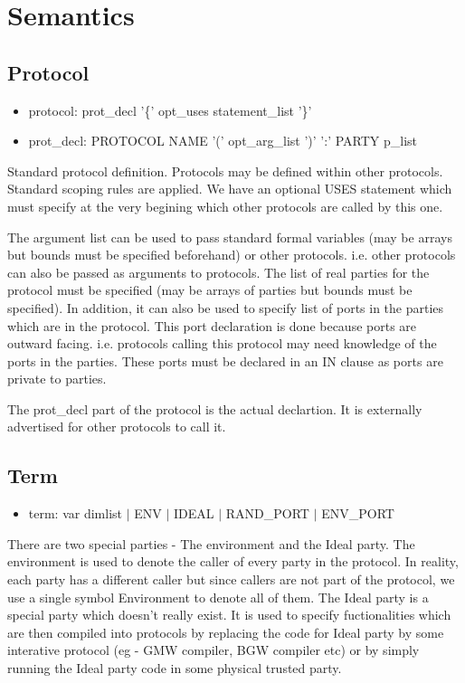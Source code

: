 
\section{Semantics}

\subsection{Protocol}

\begin{itemize}
\item protocol: prot\_decl '\{' opt\_uses statement\_list '\}'
\item prot\_decl: PROTOCOL NAME '(' opt\_arg\_list ')' ':' PARTY p\_list
\end{itemize}

Standard protocol definition. Protocols may be defined within other protocols. Standard scoping rules are applied. We have an optional USES statement which must specify at the very begining which other protocols are called by this one.

The argument list can be used to pass standard formal variables (may be arrays but bounds must be specified beforehand) or other protocols. i.e. other protocols can also be passed as arguments to protocols. The list of real parties for the protocol must be specified (may be arrays of parties but bounds must be specified). In addition, it can also be used to specify list of ports in the parties which are in the protocol. This port declaration is done because ports are outward facing. i.e. protocols calling this protocol may need knowledge of the ports in the parties. These ports must be declared in an IN clause as ports are private to parties.

The prot\_decl part of the protocol is the actual declartion. It is externally advertised for other protocols to call it.

\subsection{Term}
\begin{itemize}
\item term: var dimlist $|$ ENV $|$ IDEAL $|$ RAND\_PORT $|$ ENV\_PORT
\end{itemize}

There are two special parties - The environment and the Ideal party. The environment is used to denote the caller of every party in the protocol. In reality, each party has a different caller but since callers are not part of the protocol, we use a single symbol Environment to denote all of them. The Ideal party is a special party which doesn't really exist. It is used to specify fuctionalities which are then compiled into protocols by replacing the code for Ideal party by some interative protocol (eg - GMW compiler, BGW compiler etc) or by simply running the Ideal party code in some physical trusted party.

